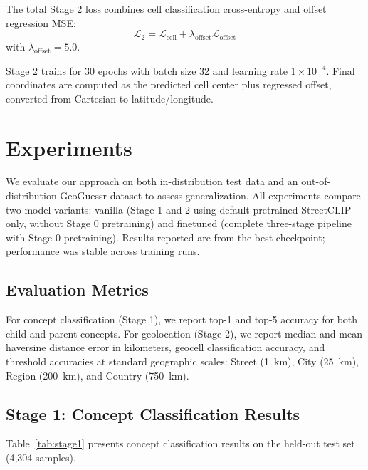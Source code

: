 \documentclass{uva-inf-article}
\begin{document}
The total Stage 2 loss combines cell classification cross-entropy and offset regression MSE:
\begin{equation}
\mathcal{L}_2 = \mathcal{L}_{\text{cell}} + \lambda_{\text{offset}}\mathcal{L}_{\text{offset}}
\end{equation}
with $\lambda_{\text{offset}} = 5.0$.

Stage 2 trains for 30 epochs with batch size 32 and learning rate $1 \times 10^{-4}$. Final coordinates are computed as the predicted cell center plus regressed offset, converted from Cartesian to latitude/longitude.


\section{Experiments}
\label{sec:experiments}

We evaluate our approach on both in-distribution test data and an out-of-distribution GeoGuessr dataset to assess generalization. All experiments compare two model variants: vanilla (Stage 1 and 2 using default pretrained StreetCLIP only, without Stage 0 pretraining) and finetuned (complete three-stage pipeline with Stage 0 pretraining). Results reported are from the best checkpoint; performance was stable across training runs.

\subsection{Evaluation Metrics}

For concept classification (Stage 1), we report top-1 and top-5 accuracy for both child and parent concepts. For geolocation (Stage 2), we report median and mean haversine distance error in kilometers, geocell classification accuracy, and threshold accuracies at standard geographic scales: Street (1~km), City (25~km), Region (200~km), and Country (750~km).

\subsection{Stage 1: Concept Classification Results}

Table~\ref{tab:stage1} presents concept classification results on the held-out test set (4,304 samples).
\end{document}

